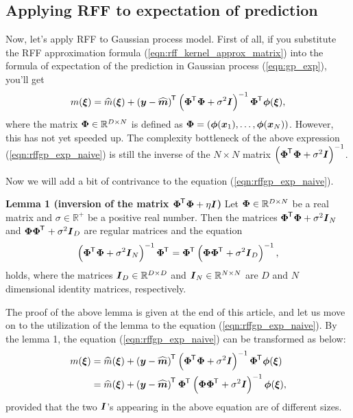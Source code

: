 \documentclass[twocolumn,a4paper,10pt]{article}
\begin{document}
\subsection{Applying RFF to expectation of prediction}

Now, let's apply RFF to Gaussian process model. First of all, if you substitute the RFF
approximation formula (\ref{eqn:rff_kernel_approx_matrix}) into the formula of expectation of
the prediction in Gaussian process (\ref{eqn:gp_exp}), you'll get
\begin{equation}
    m (\boldsymbol{\xi}) = \widehat{m} (\boldsymbol{\xi}) + \left( \boldsymbol{y} - \widehat{\boldsymbol{m}} \right)^{\mkern-1.5mu\mathsf{T}}\hspace{0.5pt}
    \left( \boldsymbol{\Phi}^{\mkern-1.5mu\mathsf{T}}\hspace{0.5pt} \boldsymbol{\Phi} + \sigma^2 \boldsymbol{I} \right)^{-1} \boldsymbol{\Phi}^{\mkern-1.5mu\mathsf{T}}\hspace{0.5pt} \boldsymbol{\phi} (\boldsymbol{\xi}),
    \label{eqn:rffgp_exp_naive}
\end{equation}
where the matrix $\boldsymbol{\Phi} \in \mathbb{R}^{D \times N}$ is defined as
$\boldsymbol{\Phi} = (\boldsymbol{\phi} (\boldsymbol{x}_1), \ldots, \boldsymbol{\phi} (\boldsymbol{x}_N))$.
However, this has not yet speeded up. The complexity bottleneck of the above expression
(\ref{eqn:rffgp_exp_naive}) is still the inverse of the $N \times N$ matrix
$\left( \boldsymbol{\Phi}^{\mkern-1.5mu\mathsf{T}}\hspace{0.5pt} \boldsymbol{\Phi} + \sigma^2 \boldsymbol{I} \right)^{-1}$.

Now we will add a bit of contrivance to the equation (\ref{eqn:rffgp_exp_naive}).

\vspace*{5pt}
\begin{thmbox}[M]{\bfseries{Lemma 1} (inversion of the matrix $\boldsymbol{\Phi}^{\mkern-1.5mu\mathsf{T}}\hspace{0.5pt} \boldsymbol{\Phi} + \eta \boldsymbol{I}$)}
    Let $\boldsymbol{\Phi} \in \mathbb{R}^{D \times N}$ be a real matrix and $\sigma \in \mathbb{R}^{+}$ be
    a positive real number. Then the matrices $\boldsymbol{\Phi}^{\mkern-1.5mu\mathsf{T}}\hspace{0.5pt} \boldsymbol{\Phi} + \sigma^2 \boldsymbol{I}_N$ and
    $\boldsymbol{\Phi} \boldsymbol{\Phi}^{\mkern-1.5mu\mathsf{T}}\hspace{0.5pt} + \sigma^2 \boldsymbol{I}_D$ are regular matrices and the equation
    \begin{equation}
        \left( \boldsymbol{\Phi}^{\mkern-1.5mu\mathsf{T}}\hspace{0.5pt} \boldsymbol{\Phi} + \sigma^2 \boldsymbol{I}_N \right)^{-1} \boldsymbol{\Phi}^{\mkern-1.5mu\mathsf{T}}\hspace{0.5pt}
        = \boldsymbol{\Phi}^{\mkern-1.5mu\mathsf{T}}\hspace{0.5pt} \left( \boldsymbol{\Phi} \boldsymbol{\Phi}^{\mkern-1.5mu\mathsf{T}}\hspace{0.5pt} + \sigma^2 \boldsymbol{I}_D \right)^{-1},
    \end{equation}
    holds, where the matrices $\boldsymbol{I}_D \in \mathbb{R}^{D \times D}$ and
    $\boldsymbol{I}_N \in \mathbb{R}^{N \times N}$ are $D$ and $N$ dimensional identity matrices, respectively.
\end{thmbox}

The proof of the above lemma is given at the end of this article, and let us move on to
the utilization of the lemma to the equation (\ref{eqn:rffgp_exp_naive}).
By the lemma 1, the equation (\ref{eqn:rffgp_exp_naive})
can be transformed as below:
\begin{align}
    m (\boldsymbol{\xi})
    &= \widehat{m} (\boldsymbol{\xi}) + \left( \boldsymbol{y} - \widehat{\boldsymbol{m}} \right)^{\mkern-1.5mu\mathsf{T}}\hspace{0.5pt}
    \left( \boldsymbol{\Phi}^{\mkern-1.5mu\mathsf{T}}\hspace{0.5pt} \boldsymbol{\Phi} + \sigma^2 \boldsymbol{I} \right)^{-1} \boldsymbol{\Phi}^{\mkern-1.5mu\mathsf{T}}\hspace{0.5pt}
    \boldsymbol{\phi} (\boldsymbol{\xi}) \notag \\
    &= \widehat{m} (\boldsymbol{\xi}) + \left( \boldsymbol{y} - \widehat{\boldsymbol{m}} \right)^{\mkern-1.5mu\mathsf{T}}\hspace{0.5pt}
    \boldsymbol{\Phi}^{\mkern-1.5mu\mathsf{T}}\hspace{0.5pt} \left( \boldsymbol{\Phi} \boldsymbol{\Phi}^{\mkern-1.5mu\mathsf{T}}\hspace{0.5pt} + \sigma^2 \boldsymbol{I} \right)^{-1}
    \boldsymbol{\phi} (\boldsymbol{\xi}),
    \label{eqn:rffgp_exp}
\end{align}
provided that the two $\boldsymbol{I}$'s appearing in the above equation are of different sizes.
\end{document}
